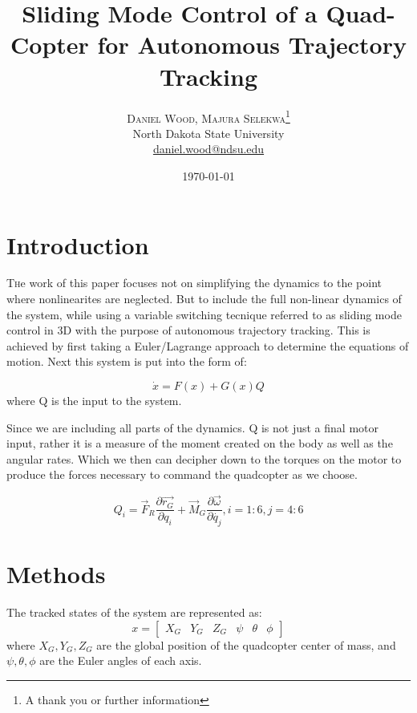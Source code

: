 \documentclass[twoside,twocolumn]{article}
\title{Sliding Mode Control of a Quad-Copter for Autonomous Trajectory Tracking} %
\author{%
\textsc{Daniel Wood, Majura Selekwa}\thanks{A thank you or further information} \\[1ex] %
\normalsize North Dakota State University \\ %
\normalsize \href{mailto:daniel.wood@ndsu.edu}{daniel.wood@ndsu.edu} %
}
\date{\today} %
\begin{document}
\maketitle


\section{Introduction}

\lettrine[nindent=0em,lines=3]{T} he work of this paper focuses not on simplifying the dynamics to the point where nonlinearites are neglected. But to include the full non-linear dynamics of the system, while using a variable switching tecnique referred to as sliding mode control in 3D with the purpose of autonomous trajectory tracking. This is achieved by first taking a Euler/Lagrange approach to determine the equations of motion. Next this system is put into the form of:

\begin{equation}
\dot{x} = F(x) + G(x)Q
\end{equation}
where Q is the input to the system.

Since we are including all parts of the dynamics. Q is not just a final motor input, rather it is a measure of the moment created on the body as well as the angular rates. Which we then can decipher down to the torques on the motor to produce the forces necessary to command the quadcopter as we choose.

\begin{equation}
Q_{i}=\overrightarrow{F}_{R}\frac{\partial\overrightarrow{r_{G}}}{\partial q_{i}}+\overrightarrow{M}_{G}\frac{\partial\overrightarrow{\omega}}{\partial\dot{q_{j}}}, i=1:6, j=4:6
\end{equation}

\section{Methods}

The tracked states of the system are represented as:
\begin{equation}
x=[\begin{array}{cccccc}
X_{G} & Y_{G} & Z_{G} & \psi & \theta & \phi\end{array}]
\end{equation}
where $X_{G},Y_{G},Z_{G}$ are the global position of the quadcopter center of mass, and $\psi,\theta,\phi$ are the Euler angles of each axis.
\end{document}
